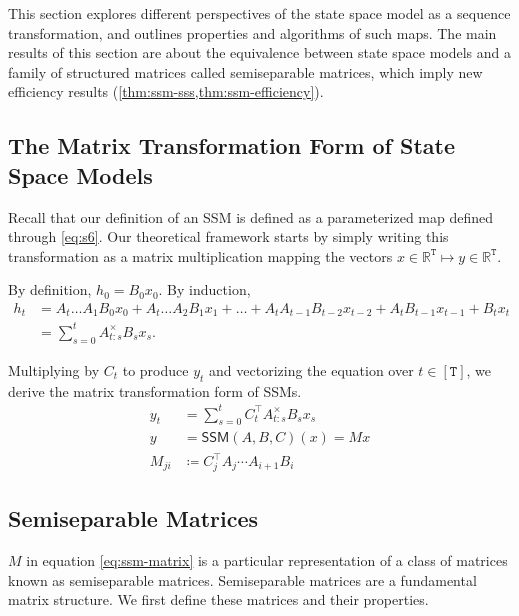 \documentclass{article}
\newcommand{\R}{\mathbb{R}}
\begin{document}
This section explores different perspectives of the state space model as a sequence transformation, and outlines properties and algorithms of such maps.
The main results of this section are about the equivalence between state space models and a family of structured matrices called semiseparable matrices,
which imply new efficiency results (\cref{thm:ssm-sss,thm:ssm-efficiency}).

\subsection{The Matrix Transformation Form of State Space Models}

Recall that our definition of an SSM is defined as a parameterized map
defined through \eqref{eq:s6}.
Our theoretical framework starts by simply writing this transformation as a matrix multiplication mapping the vectors $x \in \R^\mathtt{T} \mapsto y \in \R^\mathtt{T}$.

By definition, $h_0 = B_0 x_0$.
By induction,
\begin{align*}
  h_t &= A_t \dots A_1 B_0 x_0 + A_t \dots A_2 B_1 x_1 + \dots + A_t A_{t-1} B_{t-2} x_{t-2} + A_t B_{t-1} x_{t-1} + B_t x_t
    \\&= \sum_{s=0}^t A_{t:s}^\times B_s x_s
    .
\end{align*}

Multiplying by $C_t$ to produce $y_t$ and vectorizing the equation over $t \in [\mathtt{T}]$,
we derive the matrix transformation form of SSMs.
\begin{equation}
  \label{eq:ssm-matrix}
  \begin{aligned}
    y_t &= \sum_{s=0}^t C_t^{\top} A_{t:s}^\times B_s x_s
    \\
    y &= \mathsf{SSM}(A, B, C)(x) = Mx
    \\
    M_{ji} &\coloneqq C_j^{\top} A_{j} \cdots A_{i+1} B_{i}
  \end{aligned}
\end{equation}

\subsection{Semiseparable Matrices}

$M$ in equation \eqref{eq:ssm-matrix} is a particular representation of a class of matrices known as semiseparable matrices.
Semiseparable matrices are a fundamental matrix structure.
We first define these matrices and their properties.
\end{document}
